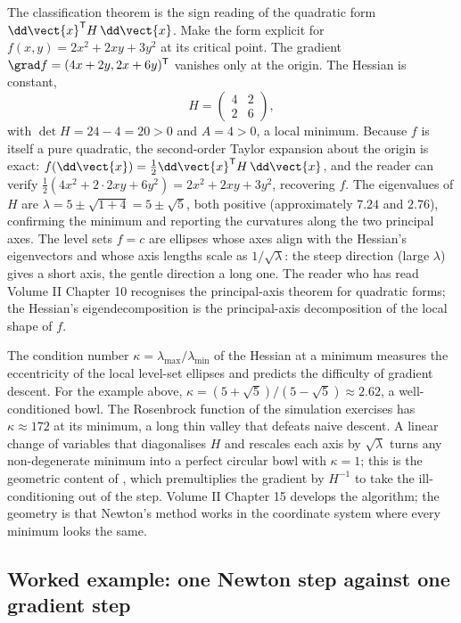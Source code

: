 The classification theorem is the sign reading of the quadratic form
$\dd\vect{x}^{\mathsf{T}} H\,\dd\vect{x}$. Make the form explicit for
$f(x, y) = 2 x^{2} + 2 x y + 3 y^{2}$ at its critical point. The
gradient $\grad f = (4 x + 2 y, 2 x + 6 y)^{\mathsf{T}}$ vanishes
only at the origin. The Hessian is constant,
\[
H = \begin{pmatrix} 4 & 2 \\ 2 & 6 \end{pmatrix},
\]
with $\det H = 24 - 4 = 20 > 0$ and $A = 4 > 0$, a local minimum.
Because $f$ is itself a pure quadratic, the second-order Taylor
expansion about the origin is exact: $f(\dd\vect{x}) = \tfrac{1}{2}
\dd\vect{x}^{\mathsf{T}} H\,\dd\vect{x}$, and the reader can verify
$\tfrac{1}{2}(4 x^{2} + 2 \cdot 2 x y + 6 y^{2}) = 2 x^{2} + 2 x y +
3 y^{2}$, recovering $f$. The eigenvalues of $H$ are $\lambda =
5 \pm \sqrt{1 + 4} = 5 \pm \sqrt{5}$, both positive (approximately
$7.24$ and $2.76$), confirming the minimum and reporting the
curvatures along the two principal axes. The level sets $f = c$ are
ellipses whose axes align with the Hessian's eigenvectors and whose
axis lengths scale as $1/\sqrt{\lambda}$: the steep direction
(large $\lambda$) gives a short axis, the gentle direction a long
one. The reader who has read Volume II Chapter 10 recognises the
principal-axis theorem for quadratic forms; the Hessian's
eigendecomposition is the principal-axis decomposition of the local
shape of $f$.

\begin{mastery}
The condition number $\kappa = \lambda_{\max}/\lambda_{\min}$ of the
Hessian at a minimum measures the eccentricity of the local level-set
ellipses and predicts the difficulty of gradient descent. For the
example above, $\kappa = (5 + \sqrt 5)/(5 - \sqrt 5) \approx 2.62$, a
well-conditioned bowl. The Rosenbrock function of the simulation
exercises has $\kappa \approx 172$ at its minimum, a long thin
valley that defeats naive descent. A linear change of variables that
diagonalises $H$ and rescales each axis by $\sqrt{\lambda}$ turns
any non-degenerate minimum into a perfect circular bowl with
$\kappa = 1$; this is the geometric content of , which premultiplies the gradient by $H^{-1}$ to take the
ill-conditioning out of the step. Volume II Chapter 15 develops the
algorithm; the geometry is that Newton's method works in the
coordinate system where every minimum looks the same.
\end{mastery}

\subsection{Worked example: one Newton step against one gradient step}

